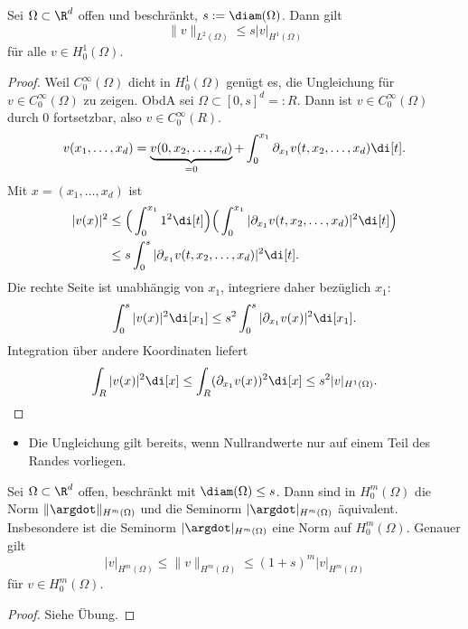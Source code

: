 \begin{st}
	Sei $\Omega \subset \R^d$ offen und beschränkt, $s := \diam(\Omega)$.
	Dann gilt
	\[
		\|v\|_{L^2(\Omega)} \le s |v|_{H^1(\Omega)}
	\]
	für alle $v \in H_0^1(\Omega)$.
	\begin{proof}
		Weil $C_0^\infty(\Omega)$ dicht in $H_0^1(\Omega)$ genügt es, die Ungleichung für $v \in C_0^\infty(\Omega)$ zu zeigen.
		ObdA sei $\Omega \subset [0,s]^d =: R$.
		Dann ist $v \in C_0^\infty(\Omega)$ durch $0$ fortsetzbar, also $v \in C_0^\infty(R)$.
		\[
			v(x_1, \dotsc, x_d) = \underbrace{v(0, x_2, \dotsc, x_d)}_{=0} +  \int_0^{x_1} \partial_{x_1} v(t, x_2, \dotsc, x_d) \di[t].
		\]
		Mit $x = (x_1, \dotsc, x_d)$ ist
		\begin{align*}
			|v(x)|^2
			&\le \Big(\int_0^{x_1} 1^2 \di[t] \Big) \Big( \int_0^{x_1} |\partial_{x_1} v(t,x_2,\dotsc, x_d)|^2 \di[t] \Big) \\
			&\le s \int_0^s |\partial_{x_1} v(t, x_2, \dotsc, x_d)|^2 \di[t].
		\end{align*}
		Die rechte Seite ist unabhängig von $x_1$, integriere daher bezüglich $x_1$:
		\[
			\int_0^s |v(x)|^2 \di[x_1]
			\le s^2 \int_0^s |\partial_{x_1} v(x)|^2 \di[x_1].
		\]
		Integration über andere Koordinaten liefert
		\[
			\int_R |v(x)|^2 \di[x]
			\le \int_R (\partial_{x_1} v(x))^2 \di[x]
			\le s^2 |v|_{H^1(\Omega)}.
		\]
	\end{proof}
	\begin{note}
		\begin{itemize}
			\item
				Die Ungleichung gilt bereits, wenn Nullrandwerte nur auf einem Teil des Randes vorliegen.
		\end{itemize}
	\end{note}
\end{st}

\begin{st} \label{3.13}
	Sei $\Omega \subset \R^d$ offen, beschränkt mit $\diam(\Omega) \le s$.
	Dann sind in $H_0^m(\Omega)$ die Norm $\|\argdot\|_{H^m(\Omega)}$ und die Seminorm $|\argdot|_{H^m(\Omega)}$ äquivalent.
	Insbesondere ist die Seminorm $|\argdot|_{H^m(\Omega)}$ eine Norm auf $H_0^m(\Omega)$.
	Genauer gilt
	\[
		|v|_{H^m(\Omega)}
		\le \|v\|_{H^m(\Omega)}
		\le (1 + s)^m |v|_{H^m(\Omega)}
	\]
	für $v \in H_0^m(\Omega)$.
	\begin{proof}
		Siehe Übung.
	\end{proof}
\end{st}


